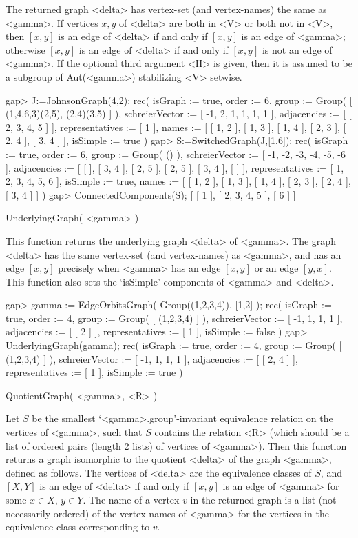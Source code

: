 The returned graph <delta>  has vertex-set (and vertex-names) the same
as <gamma>.  If vertices $x,y$ of <delta> are both in <V> or both not
in <V>, then $[x,y]$ is an edge of <delta> if and only if $[x,y]$ is an
edge of <gamma>; otherwise $[x,y]$ is an edge of <delta> if and only if
$[x,y]$ is not an edge of <gamma>.  If the optional third argument <H>
is given, then it is assumed to be a subgroup of Aut(<gamma>) stabilizing
<V> setwise.

\beginexample
gap> J:=JohnsonGraph(4,2);
rec(
  isGraph := true,
  order := 6,
  group := Group( [ (1,4,6,3)(2,5), (2,4)(3,5) ] ),
  schreierVector := [ -1, 2, 1, 1, 1, 1 ],
  adjacencies := [ [ 2, 3, 4, 5 ] ],
  representatives := [ 1 ],
  names := [ [ 1, 2 ], [ 1, 3 ], [ 1, 4 ], [ 2, 3 ], [ 2, 4 ], [ 3, 4 ] ],
  isSimple := true )
gap> S:=SwitchedGraph(J,[1,6]);
rec(
  isGraph := true,
  order := 6,
  group := Group( () ),
  schreierVector := [ -1, -2, -3, -4, -5, -6 ],
  adjacencies := [ [  ], [ 3, 4 ], [ 2, 5 ], [ 2, 5 ], [ 3, 4 ], [  ] ],
  representatives := [ 1, 2, 3, 4, 5, 6 ],
  isSimple := true,
  names := [ [ 1, 2 ], [ 1, 3 ], [ 1, 4 ], [ 2, 3 ], [ 2, 4 ], [ 3, 4 ] ] )
gap> ConnectedComponents(S);
[ [ 1 ], [ 2, 3, 4, 5 ], [ 6 ] ]
\endexample

\>UnderlyingGraph( <gamma> )

This function returns the underlying graph <delta> of <gamma>. The graph
<delta> has the same vertex-set (and vertex-names) as <gamma>, and has
an edge $[x,y]$ precisely when <gamma> has an edge $[x,y]$ or an edge
$[y,x]$. This function also sets the `isSimple' components of <gamma>
and <delta>.

\beginexample
gap> gamma := EdgeOrbitsGraph( Group((1,2,3,4)), [1,2] );
rec(
  isGraph := true,
  order := 4,
  group := Group( [ (1,2,3,4) ] ),
  schreierVector := [ -1, 1, 1, 1 ],
  adjacencies := [ [ 2 ] ],
  representatives := [ 1 ],
  isSimple := false )
gap> UnderlyingGraph(gamma);
rec(
  isGraph := true,
  order := 4,
  group := Group( [ (1,2,3,4) ] ),
  schreierVector := [ -1, 1, 1, 1 ],
  adjacencies := [ [ 2, 4 ] ],
  representatives := [ 1 ],
  isSimple := true )
\endexample


\>QuotientGraph( <gamma>, <R> )

Let $S$ be the smallest `<gamma>.group'-invariant equivalence relation
on the vertices of <gamma>, such that $S$ contains the relation <R>
(which should be a list of ordered pairs (length 2 lists) of vertices
of <gamma>). Then this function returns a graph isomorphic to the
quotient <delta> of the graph <gamma>, defined as follows. The vertices
of <delta> are the equivalence classes of $S$, and $[X,Y]$ is an edge of
<delta> if and only if $[x,y]$ is an edge of <gamma> for some $x\in X$,
$y\in Y$.  The name of a vertex $v$ in the returned graph is a list (not
necessarily ordered) of the vertex-names of <gamma> for the vertices in
the equivalence class corresponding to $v$.

